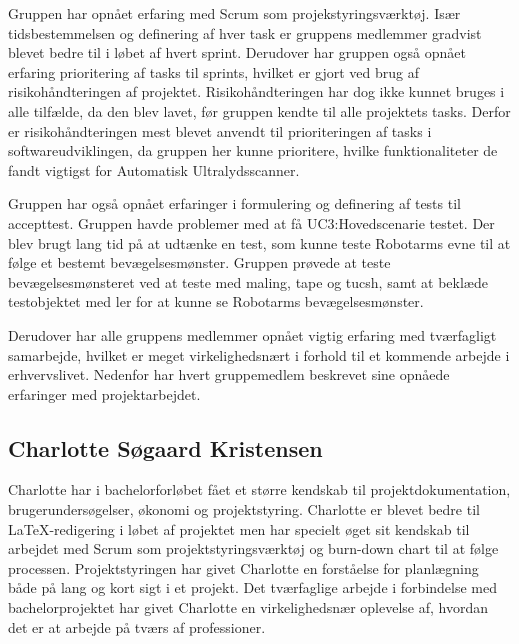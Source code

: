 Gruppen har opnået erfaring med Scrum som projekstyringsværktøj. Især tidsbestemmelsen og definering af hver task er gruppens medlemmer gradvist blevet bedre til i løbet af hvert sprint. Derudover har gruppen også opnået erfaring prioritering af tasks til sprints, hvilket er gjort ved brug af risikohåndteringen af projektet. Risikohåndteringen har dog ikke kunnet bruges i alle tilfælde, da den blev lavet, før gruppen kendte til alle projektets tasks. Derfor er risikohåndteringen mest blevet anvendt til prioriteringen af tasks i softwareudviklingen, da gruppen her kunne prioritere, hvilke funktionaliteter de fandt vigtigst for Automatisk Ultralydsscanner. 

Gruppen har også opnået erfaringer i formulering og definering af tests til accepttest. Gruppen havde problemer med at få UC3:Hovedscenarie testet. Der blev brugt lang tid på at udtænke en test, som kunne teste Robotarms evne til at følge et bestemt bevægelsesmønster. Gruppen prøvede at teste bevægelsesmønsteret ved at teste med maling, tape og tucsh, samt at beklæde testobjektet med ler for at kunne se Robotarms bevægelsesmønster. 

Derudover har alle gruppens medlemmer opnået vigtig erfaring med tværfagligt samarbejde, hvilket er meget virkelighedsnært i forhold til et kommende arbejde i erhvervslivet. 
Nedenfor har hvert gruppemedlem beskrevet sine opnåede erfaringer med projektarbejdet. 

\subsection{Charlotte Søgaard Kristensen}
Charlotte har i bachelorforløbet fået et større kendskab til projektdokumentation, brugerundersøgelser, økonomi og projektstyring. Charlotte er blevet bedre til LaTeX-redigering i løbet af projektet men har specielt øget sit kendskab til arbejdet med Scrum som projektstyringsværktøj og burn-down chart til at følge processen. Projektstyringen har givet Charlotte en forståelse for planlægning både på lang og kort sigt i et projekt. Det tværfaglige arbejde i forbindelse med bachelorprojektet har givet Charlotte en virkelighedsnær oplevelse af, hvordan det er at arbejde på tværs af professioner. 

